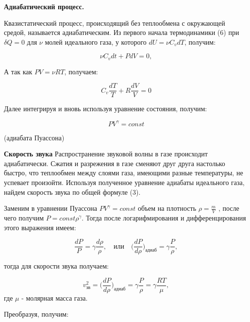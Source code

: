 \documentclass[10pt]{article}
\begin{document}
    \textbf{Адиабатический процесс.}

    Квазистатический процесс, происходящий без теплообмена с окружающей средой, называется адиабатическим.
    Из первого начала термодинамики (6) при $\delta Q = 0$ для $\nu$ молей идеального газа, у которого $dU = \nu C_v dT$, получим:

    \begin{equation}
        \nu C_v dt + P dV = 0,
    \end{equation}

    А так как $PV = \nu RT$, получаем: 

    \begin{equation}
        C_v \frac{dT}{T} + R \frac{dV}{V} = 0
    \end{equation}

    Далее интегрируя и вновь используя уравнение состояния, получим:

    \begin{equation}
        PV^{\gamma} = const
    \end{equation}

    (адиабата Пуассона)

    \textbf{Скорость звука}
    Распространение звуковой волны в газе происходит адиабатически. Сжатия и разрежения в газе сменяют друг друга настолько быстро, что теплообмен между слоями газа, имеющими разные температуры, не успевает произойти. Используя полученное уравнение адиабаты идеального газа, найдем скорость звука по общей формуле (3).

    Заменим в уравнении Пуассона $PV^{\gamma} = const$ объем на плотность $\rho = \frac{m}{V}$ , после чего получим $P = const \rho^{\gamma} $. Тогда после логарифмирования и дифференцирования этого выражения имеем:

    \begin{equation}
        \frac{dP}{P} = \gamma \frac {d\rho}{\rho}, \quad \text{или} \quad \bigg(\frac{dP}{d\rho}\bigg)_\text{адиаб} = \gamma \frac{P}{\rho},
    \end{equation}

    тогда для скорости звука получаем:

    \begin{equation}
        v_\text{зв}^2 = \bigg(\frac{dP}{d\rho}\bigg)_\text{адиаб} = \gamma \frac{P}{\rho} = \gamma \frac{RT}{\mu},
    \end{equation}
    где $\mu$ - молярная масса газа.

    Преобразуя, получим:
\end{document}
